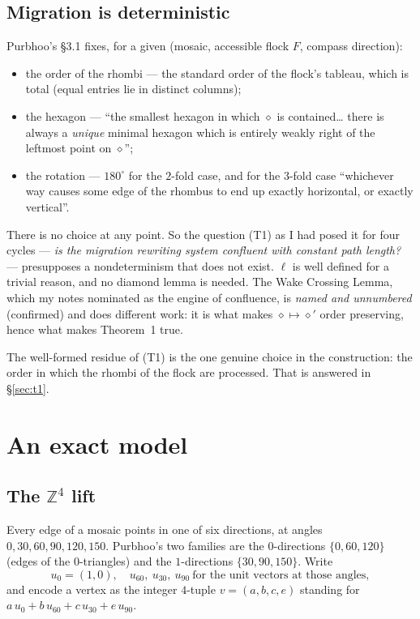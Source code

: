 \documentclass[11pt]{article}
\theoremstyle{plain}
\theoremstyle{definition}
\newcommand{\Z}{\mathbb{Z}}
\begin{document}
\subsection{Migration is deterministic}

Purbhoo's \S3.1 fixes, for a given (mosaic, accessible flock $F$, compass direction):
\begin{itemize}
\item the order of the rhombi --- the standard order of the flock's tableau, which is
      total (equal entries lie in distinct columns);
\item the hexagon --- ``the smallest hexagon in which $\diamond$ is contained\dots
      there is always a \emph{unique} minimal hexagon which is entirely weakly right
      of the leftmost point on $\diamond$'';
\item the rotation --- $180^\circ$ for the $2$-fold case, and for the $3$-fold case
      ``whichever way causes some edge of the rhombus to end up exactly horizontal,
      or exactly vertical''.
\end{itemize}
There is no choice at any point.  So the question (T1) as I had posed it for four
cycles --- \emph{is the migration rewriting system confluent with constant path
length?} --- presupposes a nondeterminism that does not exist.  $\ell$ is
well defined for a trivial reason, and no diamond lemma is needed.  The Wake
Crossing Lemma, which my notes nominated as the engine of confluence, is
\emph{named and unnumbered} (confirmed) and does different work: it is what makes
$\diamond\mapsto\diamond'$ order preserving, hence what makes Theorem~1 true.

The well-formed residue of (T1) is the one genuine choice in the construction:
the order in which the rhombi of the flock are processed.  That is answered in
\S\ref{sec:t1}.

\section{An exact model}

\subsection{The $\Z^4$ lift}

Every edge of a mosaic points in one of six directions, at angles
$0,30,60,90,120,150$.  Purbhoo's two families are the $0$-directions
$\{0,60,120\}$ (edges of the $0$-triangles) and the $1$-directions
$\{30,90,150\}$.  Write
\[
 u_0=(1,0),\quad u_{60},\ u_{30},\ u_{90}\ \text{for the unit vectors at those
 angles},
\]
and encode a vertex as the integer $4$-tuple $v=(a,b,c,e)$ standing for
$a\,u_0+b\,u_{60}+c\,u_{30}+e\,u_{90}$.
\end{document}
